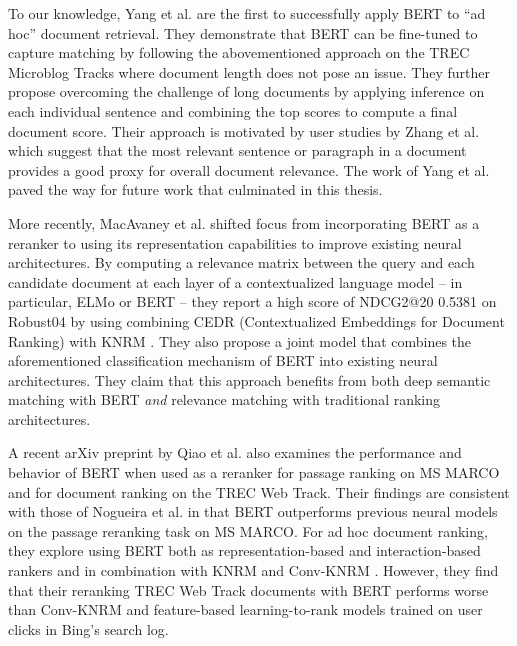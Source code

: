 To our knowledge, Yang et al. \cite{yang2019simple} are the first to successfully apply BERT to ``ad hoc'' document retrieval.
They demonstrate that BERT can be fine-tuned to capture  matching by following the abovementioned approach on the TREC Microblog Tracks where document length does not pose an issue.
They further propose overcoming the challenge of long documents by applying inference on each individual sentence and combining the top scores to compute a final document score.
Their approach is motivated by user studies by Zhang et al. \cite{zhang2018effective} which suggest that the most relevant sentence or paragraph in a document provides a good proxy for overall document relevance.
The work of Yang et al. \cite{yang2019simple} paved the way for future work that culminated in this thesis.

More recently, MacAvaney et al. \cite{macavaney2019cedr} shifted focus from incorporating BERT as a reranker to using its representation capabilities to improve existing neural architectures.
By computing a relevance matrix between the query and each candidate document at each layer of a contextualized language model -- in particular, ELMo or BERT --  they report a high score of NDCG2@20 0.5381 on Robust04 by using combining CEDR (Contextualized Embeddings for Document Ranking) with KNRM \cite{xiong2017knrm}.
They also propose a joint model that combines the aforementioned classification mechanism of BERT into existing neural architectures.
They claim that this approach benefits from both deep semantic matching with BERT \textit{and} relevance matching with traditional ranking architectures.

A recent arXiv preprint by Qiao et al. \cite{Qiao:1904.07531:2019} also examines the performance and behavior of BERT when used as a reranker for passage ranking on MS MARCO and for document ranking on the TREC Web Track.
Their findings are consistent with those of Nogueira et al. \cite{nogueira2019passage} in that BERT outperforms previous neural models on the passage reranking task on MS MARCO.
For ad hoc document ranking, they explore using BERT both as representation-based and interaction-based rankers and in combination with KNRM \cite{xiong2017knrm} and Conv-KNRM \cite{dai2018convolutional}.
However, they find that their reranking TREC Web Track documents with BERT performs worse than Conv-KNRM and feature-based learning-to-rank models trained on user clicks in Bing's search log.

